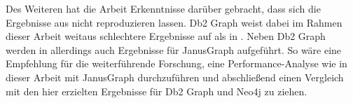Des Weiteren hat die Arbeit Erkenntnisse darüber gebracht, dass sich die Ergebnisse aus \cite{sigmod_tian} nicht reproduzieren lassen. Db2 Graph weist dabei im Rahmen dieser Arbeit weitaus schlechtere Ergebnisse auf als in \cite{sigmod_tian}. Neben Db2 Graph werden in \cite{sigmod_tian} allerdings auch Ergebnisse für JanusGraph aufgeführt. So wäre eine Empfehlung für die weiterführende Forschung, eine Performance-Analyse wie in dieser Arbeit mit JanusGraph durchzuführen und abschließend einen Vergleich mit den hier erzielten Ergebnisse für Db2 Graph und Neo4j zu ziehen. 
